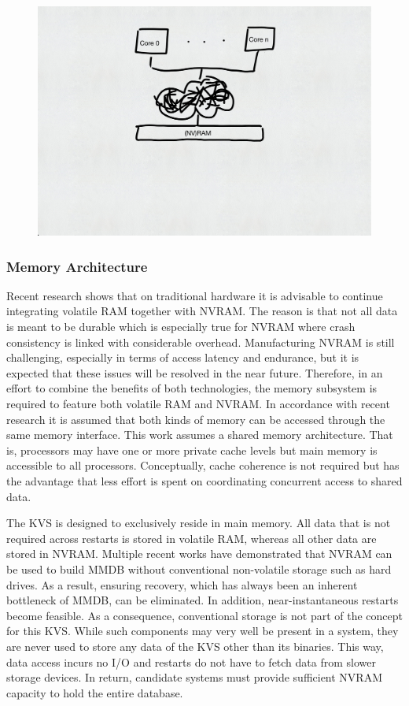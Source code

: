 \begin{figure}[!ht]
    \centering
    \includegraphics[scale=0.5]{figures/drafts/concept-sys-cpu.pdf}
    \caption{}
    \label{fig:concept-sys-cpu}
\end{figure}

\subsubsection{Memory Architecture}

Recent research shows that on traditional hardware it is advisable to continue
integrating volatile RAM together with NVRAM. The reason is that not all data is
meant to be durable which is especially true for NVRAM where crash consistency
is linked with considerable overhead. Manufacturing NVRAM is still challenging,
especially in terms of access latency and endurance, but it is expected that
these issues will be resolved in the near future. Therefore, in an effort to
combine the benefits of both technologies, the memory subsystem is required to
feature both volatile RAM and NVRAM. In accordance with recent research it is
assumed that both kinds of memory can be accessed through the same memory
interface. This work assumes a shared memory architecture. That is, processors
may have one or more private cache levels but main memory is accessible to all
processors. Conceptually, cache coherence is not required but has the advantage
that less effort is spent on coordinating concurrent access to shared data.

The KVS is designed to exclusively reside in main memory. All data that is not
required across restarts is stored in volatile RAM, whereas all other data are
stored in NVRAM. Multiple recent works have demonstrated that NVRAM can be used
to build MMDB without conventional non-volatile storage such as hard drives. As
a result, ensuring recovery, which has always been an inherent bottleneck of
MMDB, can be eliminated. In addition, near-instantaneous restarts become
feasible. As a consequence, conventional storage is not part of the concept for
this KVS. While such components may very well be present in a system, they are
never used to store any data of the KVS other than its binaries. This way, data
access incurs no I/O and restarts do not have to fetch data from slower storage
devices. In return, candidate systems must provide sufficient NVRAM capacity to
hold the entire database.

